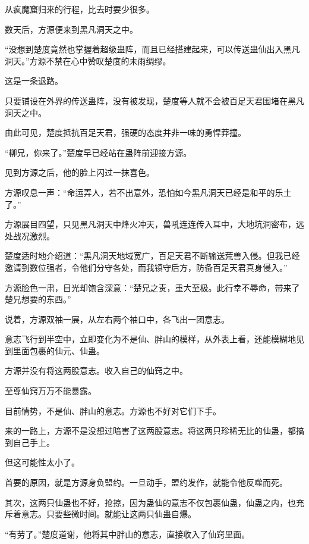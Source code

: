 
\begin{this_body}

从疯魔窟归来的行程，比去时要少很多。

数天后，方源便来到黑凡洞天之中。

“没想到楚度竟然也掌握着超级蛊阵，而且已经搭建起来，可以传送蛊仙出入黑凡洞天。”方源不禁在心中赞叹楚度的未雨绸缪。

这是一条退路。

只要铺设在外界的传送蛊阵，没有被发现，楚度等人就不会被百足天君围堵在黑凡洞天之中。

由此可见，楚度抵抗百足天君，强硬的态度并非一味的勇悍莽撞。

“柳兄，你来了。”楚度早已经站在蛊阵前迎接方源。

见到方源之后，他的脸上闪过一抹喜色。

方源叹息一声：“命运弄人，若不出意外，恐怕如今黑凡洞天已经是和平的乐土了。”

方源展目四望，只见黑凡洞天中烽火冲天，兽吼连连传入耳中，大地坑洞密布，远处战况激烈。

楚度适时地介绍道：“黑凡洞天地域宽广，百足天君不断输送荒兽入侵。但我已经邀请到数位强者，令他们分守各处，而我镇守后方，防备百足天君真身侵入。”

方源脸色一肃，目光却饱含深意：“楚兄之责，重大至极。此行幸不辱命，带来了楚兄想要的东西。”

说着，方源双袖一展，从左右两个袖口中，各飞出一团意志。

意志飞行到半空中，立即变化为不是仙、胖山的模样，从外表上看，还能模糊地见到里面包裹的仙元、仙蛊。

方源并没有将这两股意志。收入自己的仙窍之中。

至尊仙窍万万不能暴露。

目前情势，不是仙、胖山的意志。方源也不好对它们下手。

来的一路上，方源不是没想过暗害了这两股意志。将这两只珍稀无比的仙蛊，都搞到自己手上。

但这可能性太小了。

首要的原因，就是方源身负盟约。一旦动手，盟约发作，就能令他反噬而死。

其次，这两只仙蛊也不好，抢掠，因为蛊仙的意志不仅包裹仙蛊，仙蛊之内，也充斥着意志。只要些微时间。就能让这两只仙蛊自爆。

“有劳了。”楚度道谢，他将其中胖山的意志，直接收入了仙窍里面。


\end{this_body}
